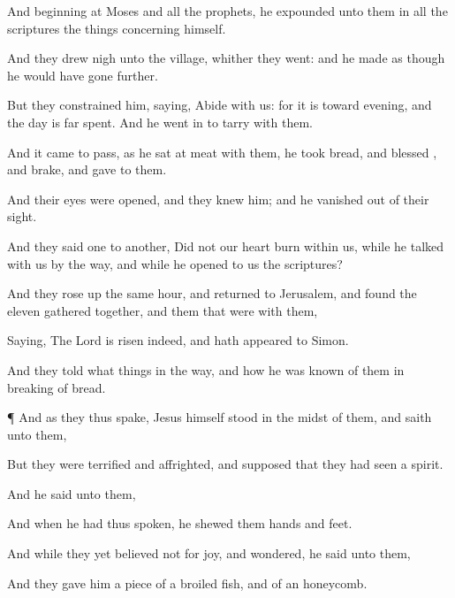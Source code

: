 {

And
beginning
at
Moses
and
all the
prophets, he
expounded unto
them
in
all the
scriptures the
things
concerning
himself.

And they drew
nigh
unto the
village,
whither they
went:
and
he made as
though he would have
gone
further.

But they
constrained
him,
saying,
Abide
with
us:
for it
is
toward
evening,
and the
day is far
spent.
And he went
in to
tarry
with
them.

And it came to
pass, as
he sat at
meat
with
them, he
took
bread, and
blessed
{},
and
brake, and
gave to
them.

And
their
eyes were
opened,
and they
knew
him;
and
he vanished
out
of
their
sight.

And they
said one
to
another,
Did
not
our
heart
burn
within
us,
while he
talked with
us
by the
way,
and
while he
opened to
us the
scriptures?

And they rose
up the
same
hour, and
returned
to
Jerusalem,
and
found the
eleven gathered
together,
and them that
were
with
them,

Saying, The
Lord is
risen
indeed,
and hath
appeared to
Simon.

And
they
told what
things
{}
in the
way,
and
how he was
known of
them
in
breaking of
bread.


\par }{\PP {}¶ And
as
they
thus
spake,
Jesus
himself
stood
in the
midst of
them,
and
saith unto
them,
{}

But they were
terrified
and
affrighted, and supposed
that they had
seen a
spirit.

And he
said unto
them,
{}


And
when he
had
thus
spoken, he
shewed
them
{}
hands
and
{}
feet.

And while
they
yet believed
not
for
joy,
and
wondered, he
said unto
them,
{}

And they
gave
him a
piece of a
broiled
fish,
and
of
an
honeycomb.

}
